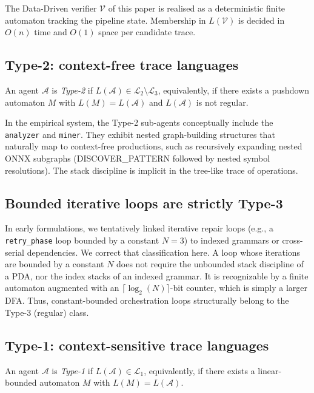 The Data-Driven verifier $\mathcal{V}$ of this paper is realised
as a deterministic finite automaton tracking the pipeline state.
Membership in $L(\mathcal{V})$ is decided in $O(n)$ time and $O(1)$
space per candidate trace.

\subsection{Type-2: context-free trace languages}
\sloppy


\begin{definition}
\label{def:type2agent}
An agent $\mathcal{A}$ is \emph{Type-2} if $L(\mathcal{A}) \in
\mathcal{L}_2 \setminus \mathcal{L}_3$, equivalently, if there
exists a pushdown automaton $M$ with $L(M) = L(\mathcal{A})$ and
$L(\mathcal{A})$ is not regular.
\end{definition}

In the empirical system, the Type-2 sub-agents conceptually
include the \texttt{analyzer} and \texttt{miner}.  They exhibit
nested graph-building structures that naturally map to context-free
productions, such as recursively expanding nested ONNX subgraphs
(\textsf{DISCOVER\_PATTERN} followed by nested symbol resolutions).
The stack discipline is implicit in the tree-like trace of operations.

\subsection{Bounded iterative loops are strictly Type-3}

In early formulations, we tentatively linked iterative repair loops
(e.g., a \texttt{retry\_phase} loop bounded by a constant $N=3$) to
indexed grammars or cross-serial dependencies. We correct that
classification here. A loop whose iterations are bounded by a constant
$N$ does not require the unbounded stack discipline of a PDA, nor
the index stacks of an indexed grammar. It is recognizable by a
finite automaton augmented with an $\lceil \log_2(N) \rceil$-bit
counter, which is simply a larger DFA. Thus, constant-bounded
orchestration loops structurally belong to the Type-3 (regular) class.

\subsection{Type-1: context-sensitive trace languages}
\sloppy

\begin{definition}
\label{def:type1agent}
An agent $\mathcal{A}$ is \emph{Type-1} if $L(\mathcal{A}) \in
\mathcal{L}_1$, equivalently, if there exists a linear-bounded
automaton $M$ with $L(M) = L(\mathcal{A})$.
\end{definition}


